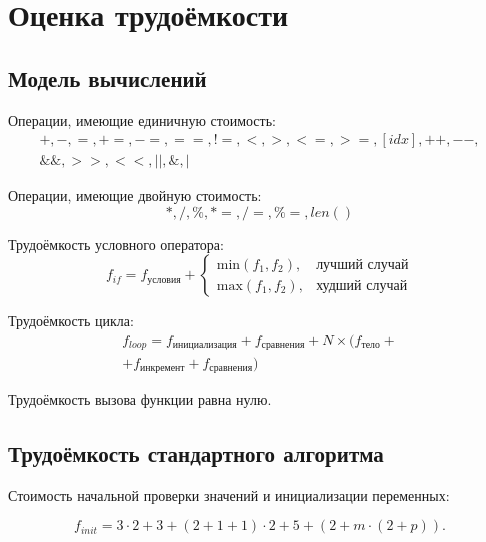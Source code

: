 \section{Оценка трудоёмкости}

\subsection{Модель вычислений}\label{sub:model}

Операции, имеющие единичную стоимость:
\begin{equation}
    \begin{gathered}
        +, -, =, +=, -=, ==, !=, <, >, <=, >=, [idx], ++, {-}-,\\
        \&\&, >>, <<, ||, \&, |
    \end{gathered}
\end{equation}

Операции, имеющие двойную стоимость:
\begin{equation}
    *, /, \%, *=, /=, \%=, len()
\end{equation}

Трудоёмкость условного оператора:
\begin{equation}
    f_{if} = f_{\text{условия}} + 
    \begin{cases}
        \text{min}(f_1, f_2), & \text{лучший случай}\\
        \text{max}(f_1, f_2), & \text{худший случай}
    \end{cases}
\end{equation}

Трудоёмкость цикла:
\begin{equation}
    \begin{gathered}
        f_{loop} = f_{\text{инициализация}} + f_{\text{сравнения}} + N \times (f_{\text{тело}} +\\
        + f_{\text{инкремент}} + f_{\text{сравнения}})
    \end{gathered}
\end{equation}

Трудоёмкость вызова функции равна нулю.

\subsection{Трудоёмкость стандартного алгоритма}

Стоимость начальной проверки значений и инициализации переменных:

\begin{equation}
    \label{eq:std_init}
    f_{init} = 3 \cdot 2 + 3 + (2 + 1 + 1) \cdot 2 + 5 + (2 + m \cdot (2 + p)). 
\end{equation}

